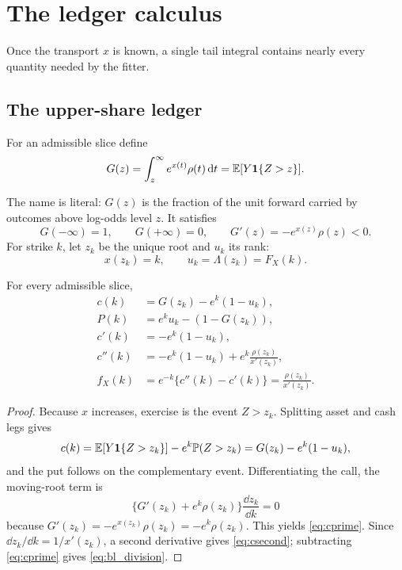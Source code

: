 \section{The ledger calculus}
\label{sec:ledger}

Once the transport $x$ is known, a single tail integral contains nearly every
quantity needed by the fitter.

\subsection{The upper-share ledger}

\begin{definition}
\label{def:ledger}
For an admissible slice define
\begin{equation}
G(z)=\int_z^\infty e^{x(t)}\rho(t)\,\mathrm{d} t
=\mathbb{E}[Y\mathbf{1}\{Z>z\}].
\label{eq:ledger}
\end{equation}
\end{definition}

The name is literal: $G(z)$ is the fraction of the unit forward carried by
outcomes above log-odds level $z$.  It satisfies
\begin{equation}
G(-\infty)=1,\qquad G(+\infty)=0,\qquad
G'(z)=-e^{x(z)}\rho(z)<0.
\label{eq:ledgerprops}
\end{equation}
For strike $k$, let $z_k$ be the unique root and $u_k$ its rank:
\begin{equation}
x(z_k)=k,\qquad u_k=\Lambda(z_k)=F_X(k).
\label{eq:strikeroot}
\end{equation}

\begin{proposition}
\label{prop:pricing}
For every admissible slice,
\begin{align}
c(k)&=G(z_k)-e^k(1-u_k),
\label{eq:call}\\
P(k)&=e^ku_k-(1-G(z_k)),
\label{eq:put}\\
c'(k)&=-e^k(1-u_k),
\label{eq:cprime}\\
c''(k)&=-e^k(1-u_k)+e^k\frac{\rho(z_k)}{x'(z_k)},
\label{eq:csecond}\\
f_X(k)&=e^{-k}\{c''(k)-c'(k)\}
=\frac{\rho(z_k)}{x'(z_k)}.
\label{eq:bl_division}
\end{align}
\end{proposition}

\begin{proof}
Because $x$ increases, exercise is the event $Z>z_k$.  Splitting asset and
cash legs gives
\[
c(k)=\mathbb{E}[Y\mathbf{1}\{Z>z_k\}]-e^k\mathbb{P}(Z>z_k)
=G(z_k)-e^k(1-u_k),
\]
and the put follows on the complementary event.  Differentiating the call,
the moving-root term is
\[
\{G'(z_k)+e^k\rho(z_k)\}\frac{\dd z_k}{\dd k}=0
\]
because $G'(z_k)=-e^{x(z_k)}\rho(z_k)=-e^k\rho(z_k)$.  This yields
\eqref{eq:cprime}.  Since $\dd z_k/\dd k=1/x'(z_k)$, a second derivative
gives \eqref{eq:csecond}; subtracting \eqref{eq:cprime} gives
\eqref{eq:bl_division}.
\end{proof}

